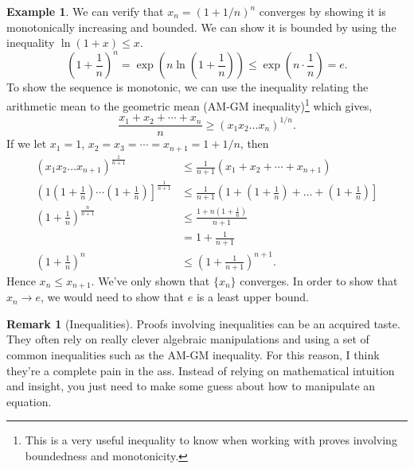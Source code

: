 \documentclass{article}
\theoremstyle{definition}
\newtheorem{example}{Example}[section]
\newtheorem{remark}{Remark}[section]
\begin{document}
	\begin{example}
		We can verify that $ x_n=(1+1/n)^n $ converges by showing it is monotonically increasing and bounded. We can show it is bounded by using the inequality $ \ln(1+x)\le x $. $$\left(1+\frac{1}{n}\right)^n=\exp\left(n\ln\left(1+\frac{1}{n} \right)\right)\le \exp\left(n\cdot\frac{1}{n}\right)=e. $$ To show the sequence is monotonic, we can use the inequality relating the arithmetic mean to the geometric mean (AM-GM inequality)\footnote{This is a very useful inequality to know when working with proves involving boundedness and monotonicity.} which gives, $$ \frac{x_1+x_2+\cdots+x_n}{n}\ge(x_1x_2\ldots x_n)^{1/n}.$$ If we let $ x_1=1 $, $ x_2=x_3=\cdots=x_{n+1}=1+1/n $, then 
		\begin{align*}
			(x_1x_2\ldots x_{n+1})^{\frac{1}{n+1}}&\le \frac{1}{n+1}(x_1+x_2+\cdots+x_{n+1})\\\left(1\left(1+\frac{1}{n}\right)\cdots \left(1+\frac{1}{n}\right)\right]^\frac{1}{n+1}&\le\frac{1}{n+1}\left(1+\left(1+\frac{1}{n}\right)+\ldots + \left(1+\frac{1}{n}\right)\right]\\\left(1+\frac{1}{n}\right)^\frac{n}{n+1}&\le \frac{1+n\left(1+\frac{1}{n}\right)}{n+1}\\&=1+\frac{1}{n+1}\\
			\left(1+\frac{1}{n}\right)^n&\le\left(1+\frac{1}{n+1}\right)^{n+1}.
		\end{align*}
		Hence $ x_n\le x_{n+1} $. We've only shown that $ \{x_n\} $ converges. In order to show that $ x_n\to e $, we would need to show that $ e $ is a least upper bound. 
	\end{example}
	\begin{remark}[Inequalities]
		Proofs involving inequalities can be an acquired taste. They often rely on really clever algebraic manipulations and using a set of common inequalities such as the AM-GM inequality. For this reason, I think they're a complete pain in the ass. Instead of relying on mathematical intuition and insight, you just need to make some guess about how to manipulate an equation. 
	\end{remark}
\end{document}
